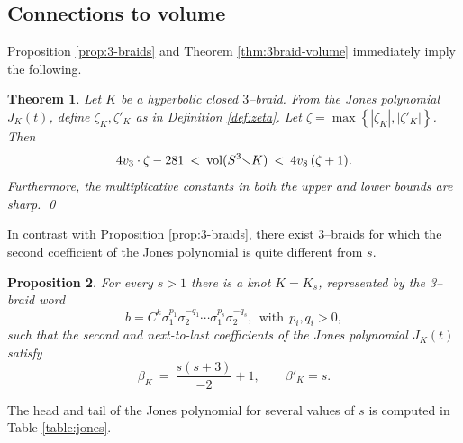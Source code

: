 \documentclass[11pt]{amsart}
\renewcommand{\setminus}{{\smallsetminus}}
\newcommand{\vol}{{\rm vol}}
\newcommand{\abs}[1]{{\left\vert #1 \right\vert}}
\theoremstyle{plain}
\newtheorem{theorem}{Theorem}[section]
\newtheorem{prop}[theorem]{Proposition}
\theoremstyle{definition}
\begin{document}
\subsection{Connections to volume}\label{subsec:volume-jones}

Proposition \ref{prop:3-braids} and Theorem \ref{thm:3braid-volume}
immediately imply the following.

\begin{theorem}
Let $K$ be a hyperbolic closed $3$--braid. 
From the Jones polynomial $J_K(t)$, define ${\zeta_K}, {\zeta'_K}$ as in Definition \ref{def:zeta}.
Let $\zeta = \max \left\{ \abs{\zeta_K}, \abs{\zeta'_K} \right\}$. Then
$$4v_3 \cdot \zeta - 281 \: < \: \vol(S^3 \setminus K) \: < \:
4v_8 \, ( \zeta +1 ).$$
Furthermore, the multiplicative constants in both the upper and lower bounds are sharp.
\label{thm:relations}
\qed
\end{theorem}


In contrast with Proposition \ref{prop:3-braids}, there exist
$3$--braids for which the second coefficient of the Jones polynomial
is quite different from $s$.

\begin{prop}\label{prop:cancelation}
For every $s>1$ there is a knot $K = K_s$, represented by the 3--braid word
$$b= C^k \sigma_1^{p_1} \sigma_2^{-q_1} \cdots \sigma_1^{p_s}
\sigma_2^{-q_s},\ \ \mbox{with} \ \ p_i, q_i>0,$$
%
such that the second and next-to-last coefficients of the Jones
polynomial $J_K(t)$ satisfy
$$\beta_K \: = \: \frac{s(s+3)}{-2} + 1 ,  \qquad \beta'_K = s.$$
\end{prop}

The head and tail of the Jones polynomial for several values of $s$ is computed in Table \ref{table:jones}.
\end{document}
